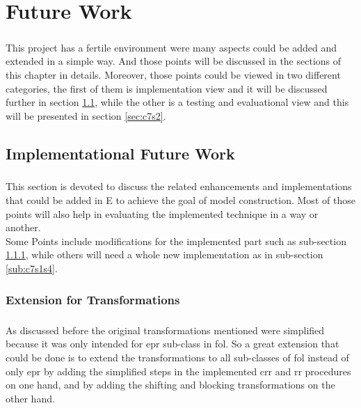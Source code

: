 \chapter{Future Work}\label{chap:todo}
	\paragraph{ }
	This project has a fertile environment were many aspects could be added and extended in a simple way.
And those points will be discussed in the sections of this chapter in details. Moreover, those points could be viewed in two different categories, the first of them is implementation view and it will be discussed further in section \ref{sec:c7s1}, while the other is a testing and evaluational view and this will be presented in section \ref{sec:c7s2}. 

	\section{Implementational Future Work}\label{sec:c7s1}
		\paragraph{ }
		This section is devoted to discuss the related enhancements and implementations that could be added in E to achieve the goal of model construction. Most of those points will also help in evaluating the implemented technique in a way or another.
\\
Some Points include modifications for the implemented part such as sub-section \ref{sub:c7s1s1}, while others will need a whole new implementation as in sub-section \ref{sub:c7s1s4}.    

		\subsection{Extension for Transformations}\label{sub:c7s1s1}
			\paragraph{ }
			As discussed before the original transformations mentioned were simplified because it was only intended for \ac{epr} sub-class in \ac{fol}. So a great extension that could be done is to extend the transformations to all sub-classes of \ac{fol} instead of only \ac{epr} by adding the simplified steps in the implemented crr and rr procedures on one hand, and by adding the shifting and blocking transformations on the other hand.

